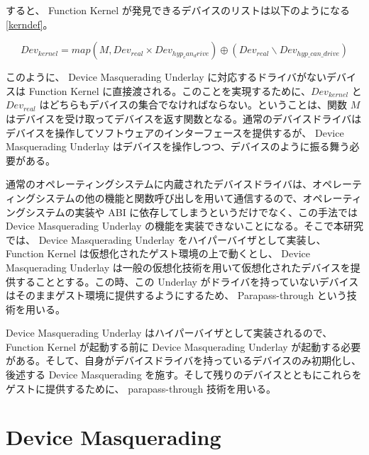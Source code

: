 \documentclass[a4paper,11pt,report]{ltjsbook}
\begin{document}
すると、 Function Kernel が発見できるデバイスのリストは以下のようになる \ref{kerndef}。

\begin{equation}
Dev_{kernel} = map(M, Dev_{real} \times Dev_{hyp_can_drive}) \oplus (Dev_{real} \backslash Dev_{hyp\_can\_drive}) \label{kerndef}
\end{equation}

このように、 Device Masquerading Underlay に対応するドライバがないデバイスは Function Kernel に直接渡される。このことを実現するために、$Dev_{kernel}$ と $Dev_{real}$ はどちらもデバイスの集合でなければならない。ということは、関数 $M$ はデバイスを受け取ってデバイスを返す関数となる。通常のデバイスドライバはデバイスを操作してソフトウェアのインターフェースを提供するが、 Device Masquerading Underlay はデバイスを操作しつつ、デバイスのように振る舞う必要がある。

通常のオペレーティングシステムに内蔵されたデバイスドライバは、オペレーティングシステムの他の機能と関数呼び出しを用いて通信するので、オペレーティングシステムの実装や ABI に依存してしまうというだけでなく、この手法では Device Masquerading Underlay の機能を実装できないことになる。そこで本研究では、 Device Masquerading Underlay をハイパーバイザとして実装し、 Function Kernel は仮想化されたゲスト環境の上で動くとし、 Device Masquerading Underlay は一般の仮想化技術を用いて仮想化されたデバイスを提供することとする。この時、この Underlay がドライバを持っていないデバイスはそのままゲスト環境に提供するようにするため、 Parapass-through \cite{bitvisor} という技術を用いる。

Device Masquerading Underlay はハイパーバイザとして実装されるので、 Function Kernel が起動する前に Device Masquerading Underlay が起動する必要がある。そして、自身がデバイスドライバを持っているデバイスのみ初期化し、後述する Device Masquerading を施す。そして残りのデバイスとともにこれらをゲストに提供するために、 parapass-through 技術を用いる。

\section{Device Masquerading}
\end{document}
